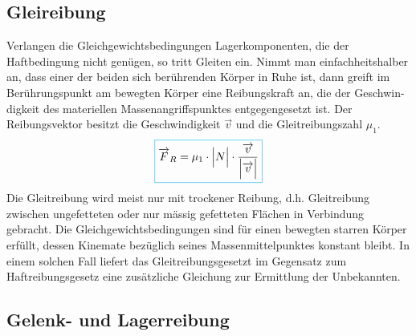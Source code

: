 \subsection{Gleireibung}
Verlangen die Gleichgewichtsbedingungen Lagerkomponenten, die der Haftbedingung nicht genügen, so tritt Gleiten ein. Nimmt man einfachheitshalber an, dass einer der beiden sich berührenden Körper in Ruhe ist, dann greift im Berührungspunkt am bewegten Körper eine Reibungskraft an, die der Geschwin-digkeit des materiellen Massenangriffspunktes entgegengesetzt ist. Der Reibungsvektor besitzt die Geschwindigkeit $\overrightarrow{v}$ und die Gleitreibungszahl $\mu_1$.
\begin{equation}
\boxed{\overrightarrow{F}_R=\-\mu_1\cdot \Big\vert N\Big\vert\cdot \dfrac{\overrightarrow{v}}{\Big\vert \overrightarrow{v}\Big\vert}}
\end{equation}
Die Gleitreibung wird meist nur mit trockener Reibung, d.h. Gleitreibung zwischen ungefetteten oder nur mässig gefetteten Flächen in Verbindung gebracht. Die Gleichgewichtsbedingungen sind für einen bewegten starren Körper erfüllt, dessen Kinemate bezüglich seines Massenmittelpunktes konstant bleibt. In einem solchen Fall liefert das Gleitreibungsgesetzt im Gegensatz zum Haftreibungsgesetz eine zusätzliche Gleichung zur Ermittlung der Unbekannten.  
\subsection{Gelenk- und Lagerreibung}
